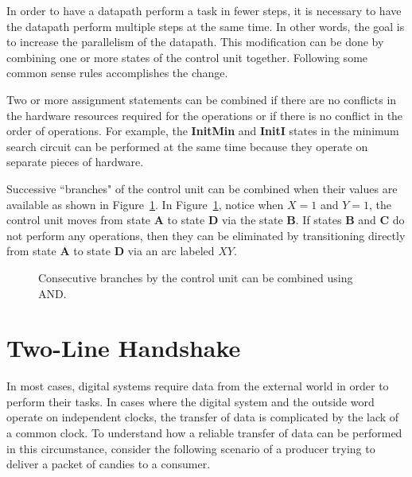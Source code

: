 In order to have a datapath perform a task in fewer steps, it is
necessary to have the datapath perform multiple steps at the 
same time.  In other words, the goal is to increase the
parallelism of the datapath.  This modification can be done by combining
one or more states of the control unit together.   
Following some common sense rules accomplishes the change.

Two or more assignment statements can be combined if there are 
no conflicts in the hardware resources required for the operations
or if there is no conflict in the order of operations.
For example, the {\bf InitMin} and {\bf InitI} states in the 
minimum search circuit can be performed at the same time because
they operate on separate pieces of hardware.  

Successive ``branches" of the control unit can be combined when
their values are available as shown in Figure~\ref{fig:Branch}.  
In Figure~\ref{fig:Branch}, notice when $X=1$ and $Y=1$,
the control unit moves from state {\bf A} to state {\bf D} via the
state {\bf B}.  If states {\bf B} and {\bf C} do not perform any
operations, then they can be eliminated by transitioning directly
from state {\bf A} to state {\bf D} via an arc labeled $XY$.

\begin{figure}[ht]
\caption{Consecutive branches by the control unit can be combined
using AND.}
\label{fig:Branch}
\end{figure}


\section{Two-Line Handshake}
In most cases, digital systems require data from the external world
in order to perform their tasks. In cases where the digital system and
the outside word operate on independent clocks, the transfer of data
is complicated by the lack of a common clock.  To understand how a
reliable transfer of data can be performed in this circumstance, consider the following
scenario of a producer trying to deliver a packet of candies to a
consumer.

